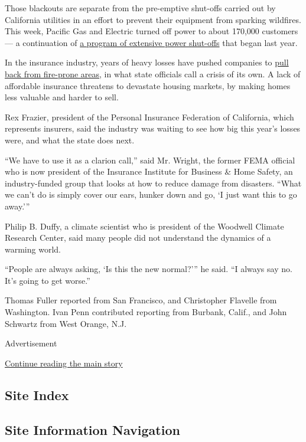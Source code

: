 Those blackouts are separate from the pre-emptive shut-offs carried out
by California utilities in an effort to prevent their equipment from
sparking wildfires. This week, Pacific Gas and Electric turned off power
to about 170,000 customers --- a continuation of
\href{https://www.nytimes3xbfgragh.onion/2019/10/09/us/pge-shut-off-power-outage.html}{a
program of extensive power shut-offs} that began last year.

In the insurance industry, years of heavy losses have pushed companies
to
\href{https://www.nytimes3xbfgragh.onion/2020/09/02/climate/wildfires-insurance.html}{pull
back from fire-prone areas}, in what state officials call a crisis of
its own. A lack of affordable insurance threatens to devastate housing
markets, by making homes less valuable and harder to sell.

Rex Frazier, president of the Personal Insurance Federation of
California, which represents insurers, said the industry was waiting to
see how big this year's losses were, and what the state does next.

``We have to use it as a clarion call,'' said Mr. Wright, the former
FEMA official who is now president of the Insurance Institute for
Business \& Home Safety, an industry-funded group that looks at how to
reduce damage from disasters. ``What we can't do is simply cover our
ears, hunker down and go, `I just want this to go away.'''

Philip B. Duffy, a climate scientist who is president of the Woodwell
Climate Research Center, said many people did not understand the
dynamics of a warming world.

``People are always asking, `Is this the new normal?''' he said. ``I
always say no. It's going to get worse.''

Thomas Fuller reported from San Francisco, and Christopher Flavelle from
Washington. Ivan Penn contributed reporting from Burbank, Calif., and
John Schwartz from West Orange, N.J.

Advertisement

\protect\hyperlink{after-bottom}{Continue reading the main story}

\hypertarget{site-index}{%
\subsection{Site Index}\label{site-index}}

\hypertarget{site-information-navigation}{%
\subsection{Site Information
Navigation}\label{site-information-navigation}}

